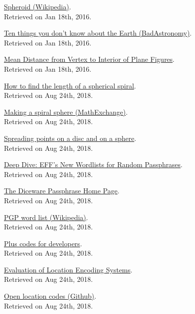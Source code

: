 \documentclass{article}
\begin{document}
\begin{thebibliography}{1}

 \href{https://en.wikipedia.org/wiki/Spheroid}{Spheroid (Wikipedia)}. \\ Retrieved on Jan 18th, 2016.

 \href{http://blogs.discovermagazine.com/badastronomy/2008/09/08/ten-things-you-dont-know-about-the-earth}{Ten things you don't know about the Earth (BadAstronomy)}. \\ Retrieved on Jan 18th, 2016.

\href{http://www.mathpages.com/home/kmath283/kmath283.htm}{Mean Distance from Vertex to Interior of Plane Figures}. \\ Retrieved on Jan 18th, 2016.

 \href{https://www.intmath.com/blog/mathematics/how-to-find-the-length-of-a-spherical-spiral-10254}{How to find the length of a spherical spiral}. \\ Retrieved on Aug 24th, 2018.

 \href{https://mathematica.stackexchange.com/questions/136308/need-help-on-making-spiral-sphere-and-cone-helix}{Making a spiral sphere (MathExchange)}. \\ Retrieved on Aug 24th, 2018.

 \href{http://blog.marmakoide.org/?p=1}{Spreading points on a disc and on a sphere}. \\ Retrieved on Aug 24th, 2018.

 \href{https://www.eff.org/deeplinks/2016/07/new-wordlists-random-passphrases}{Deep Dive: EFF's New Wordlists for Random Passphrases}. \\ Retrieved on Aug 24th, 2018.

 \href{http://world.std.com/~reinhold/diceware.html}{The Diceware Passphrase Home Page}. \\ Retrieved on Aug 24th, 2018.

 \href{https://en.wikipedia.org/wiki/PGP_word_list}{PGP word list (Wikipedia)}. \\ Retrieved on Aug 24th, 2018.

 \href{https://plus.codes/developers}{Plus codes for developers}. \\ Retrieved on Aug 24th, 2018.

 \href{https://github.com/google/open-location-code/wiki/Evaluation-of-Location-Encoding-Systems}{Evaluation of Location Encoding Systems}. \\ Retrieved on Aug 24th, 2018.

 \href{https://github.com/google/open-location-code}{Open location codes (Github)}. \\ Retrieved on Aug 24th, 2018.

\end{thebibliography}
\end{document}
